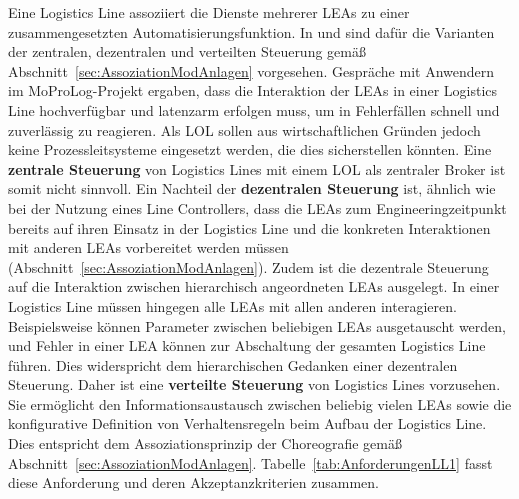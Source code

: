 Eine Logistics Line assoziiert die Dienste mehrerer LEAs zu einer zusammengesetzten Automatisierungsfunktion. In \cite{NAMURAK4.19.2020} und \cite{Cordes.2020.DE} sind dafür die Varianten der zentralen, dezentralen und verteilten Steuerung gemäß Abschnitt~\ref{sec:AssoziationModAnlagen} vorgesehen. 
Gespräche mit Anwendern im MoProLog-Projekt \cite{Blumenstein.ETFA,Blumenstein.MoProLog} ergaben, dass die Interaktion der LEAs in einer Logistics Line hochverfügbar und latenzarm erfolgen muss, um in Fehlerfällen schnell und zuverlässig zu reagieren. Als LOL sollen aus wirtschaftlichen Gründen jedoch keine Prozessleitsysteme eingesetzt werden, die dies sicherstellen könnten. Eine \textbf{zentrale Steuerung} von Logistics Lines mit einem LOL als zentraler Broker ist somit nicht sinnvoll.
Ein Nachteil der \textbf{dezentralen Steuerung} ist, ähnlich wie bei der Nutzung eines Line Controllers, dass die LEAs zum Engineeringzeitpunkt bereits auf ihren Einsatz in der Logistics Line und die konkreten Interaktionen mit anderen LEAs vorbereitet werden müssen (Abschnitt~\ref{sec:AssoziationModAnlagen}). Zudem ist die dezentrale Steuerung auf die Interaktion zwischen hierarchisch angeordneten LEAs ausgelegt. In einer Logistics Line müssen hingegen alle LEAs mit allen anderen interagieren. Beispielsweise können Parameter zwischen beliebigen LEAs ausgetauscht werden, und Fehler in einer LEA können zur Abschaltung der gesamten Logistics Line führen. Dies widerspricht dem hierarchischen Gedanken einer dezentralen Steuerung. 
Daher ist eine \textbf{verteilte Steuerung} von Logistics Lines vorzusehen. Sie ermöglicht den Informationsaustausch zwischen beliebig vielen LEAs sowie die konfigurative Definition von Verhaltensregeln beim Aufbau der Logistics Line. Dies entspricht dem Assoziationsprinzip der Choreografie gemäß Abschnitt~\ref{sec:AssoziationModAnlagen}. Tabelle~\ref{tab:AnforderungenLL1} fasst diese Anforderung und deren Akzeptanzkriterien zusammen.

